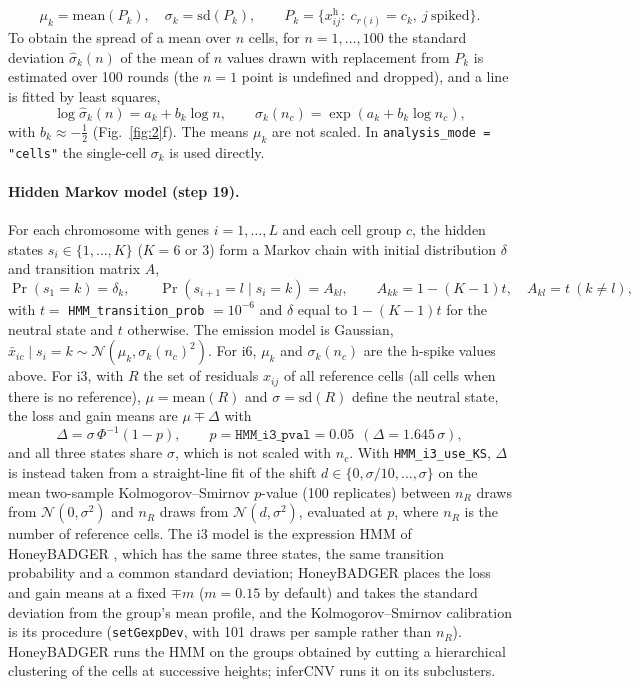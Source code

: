 \begin{equation}
\mu_k = \mathrm{mean}(P_k),\quad \sigma_k = \mathrm{sd}(P_k),\qquad P_k=\{x^{\mathrm h}_{ij}:\ c_{r(i)}=c_k,\ j\ \text{spiked}\}.
\end{equation}
To obtain the spread of a mean over $n$ cells, for $n=1,\dots,100$ the standard deviation $\hat\sigma_k(n)$ of the mean of $n$ values drawn with replacement from $P_k$ is estimated over 100 rounds (the $n=1$ point is undefined and dropped), and a line is fitted by least squares,
\begin{equation}
\log\hat\sigma_k(n) = a_k + b_k\log n,\qquad \sigma_k(n_c) = \exp(a_k + b_k\log n_c),
\end{equation}
with $b_k\approx-\tfrac12$ (Fig.~\ref{fig:2}f). The means $\mu_k$ are not scaled. In \texttt{analysis\_mode = "cells"} the single-cell $\sigma_k$ is used directly.

\paragraph{Hidden Markov model (step 19).}
For each chromosome with genes $i=1,\dots,L$ and each cell group $c$, the hidden states $s_i\in\{1,\dots,K\}$ ($K=6$ or 3) form a Markov chain with initial distribution $\delta$ and transition matrix $A$,
\begin{equation}
\Pr(s_1=k)=\delta_k,\qquad \Pr(s_{i+1}=l\mid s_i=k)=A_{kl},\qquad A_{kk}=1-(K-1)t,\quad A_{kl}=t\ (k\neq l),
\end{equation}
with $t=$ \texttt{HMM\_transition\_prob} $=10^{-6}$ and $\delta$ equal to $1-(K-1)t$ for the neutral state and $t$ otherwise. The emission model is Gaussian, $\bar x_{ic}\mid s_i=k \sim \mathcal N(\mu_k, \sigma_k(n_c)^2)$. For i6, $\mu_k$ and $\sigma_k(n_c)$ are the h-spike values above. For i3, with $R$ the set of residuals $x_{ij}$ of all reference cells (all cells when there is no reference), $\mu=\mathrm{mean}(R)$ and $\sigma=\mathrm{sd}(R)$ define the neutral state, the loss and gain means are $\mu\mp\Delta$ with
\begin{equation}
\Delta = \sigma\,\Phi^{-1}(1-p),\qquad p=\texttt{HMM\_i3\_pval}=0.05\ \ (\Delta = 1.645\,\sigma),
\end{equation}
and all three states share $\sigma$, which is not scaled with $n_c$. With \texttt{HMM\_i3\_use\_KS}, $\Delta$ is instead taken from a straight-line fit of the shift $d\in\{0,\sigma/10,\dots,\sigma\}$ on the mean two-sample Kolmogorov--Smirnov $p$-value (100 replicates) between $n_R$ draws from $\mathcal N(0,\sigma^2)$ and $n_R$ draws from $\mathcal N(d,\sigma^2)$, evaluated at $p$, where $n_R$ is the number of reference cells. The i3 model is the expression HMM of HoneyBADGER \citep{fan2018}, which has the same three states, the same transition probability and a common standard deviation; HoneyBADGER places the loss and gain means at a fixed $\mp m$ ($m=0.15$ by default) and takes the standard deviation from the group's mean profile, and the Kolmogorov--Smirnov calibration is its procedure (\texttt{setGexpDev}, with 101 draws per sample rather than $n_R$). HoneyBADGER runs the HMM on the groups obtained by cutting a hierarchical clustering of the cells at successive heights; inferCNV runs it on its subclusters.

